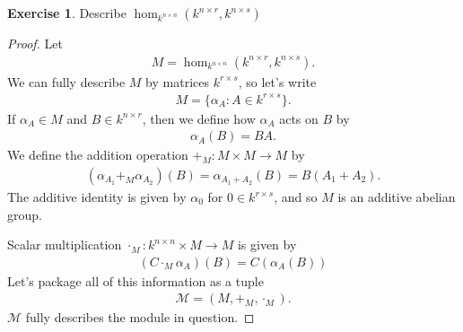\documentclass[12pt]{extarticle}
\newcommand{\set}[1]{\{#1\}}
\newcommand{\<}{\langle}
\renewcommand{\>}{\rangle}
\theoremstyle{definition}
\newtheorem{exercise}{Exercise}
\begin{document}
\begin{exercise}
  Describe $\hom_{k^{n \times n}}(k^{n \times r}, k^{n \times s})$
\end{exercise}
\begin{proof}
  Let 
  \begin{align*}
    M = \hom_{k^{n \times n}}(k^{n \times r}, k^{n \times s}).
  \end{align*}
  We can fully describe $M$ by matrices $k^{r \times s}$, so let's write
  \begin{align*}
    M = \set{\alpha_A : A \in k^{r \times s}}.
  \end{align*}
  If $\alpha_A \in M$ and $B \in k^{n \times r}$, then we define how $\alpha_A$ acts on $B$ by
  \begin{align*}
    \alpha_A(B) = BA.
  \end{align*}
  We define the addition operation $+_M: M \times M \to M$ by 
  \begin{align*}
    (\alpha_{A_1} +_M \alpha_{A_2})(B) = \alpha_{A_1 + A_2}(B) = B(A_1 + A_2).
  \end{align*}
  The additive identity is given by $\alpha_0$ for $0 \in k^{r \times s}$, and so $M$ is an additive abelian group.
  
  Scalar multiplication $\cdot_M: k^{n \times n} \times M \to M$ is given by
  \begin{align*}
    (C \cdot_M \alpha_A) (B) = C(\alpha_A(B))
  \end{align*}
  Let's package all of this information as a tuple
  \begin{align*}
    \mathcal{M} = (M, +_M, \cdot_M).
  \end{align*}
  $\mathcal{M}$ fully describes the module in question. 
\end{proof}
\end{document}
